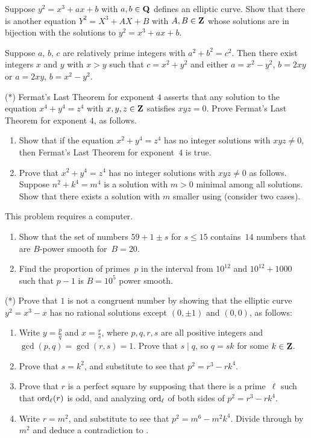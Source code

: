 \begin{exercises}
\item \label{ex:elltrans}
 Suppose $y^2=x^3+ax+b$ with $a,b\in\mathbf{Q}$ defines an elliptic
curve.  Show that there is another equation $Y^2=X^3+AX+B$ with
$A,B\in\mathbf{Z}$ whose solutions are in bijection with the
solutions to $y^2=x^3+ax+b$.


\item\label{ex:pythag} Suppose $a$, $b$, $c$ are relatively prime
  integers with $a^2+b^2=c^2$.  Then there exist integers $x$ and $y$
  with $x>y$ such that $c=x^2+y^2$ and either $a=x^2-y^2$, $b=2xy$ or
  $a=2xy$, $b=x^2-y^2$.


\item\label{ex:flt4}(*) Fermat's Last Theorem for exponent $4$ asserts
  that any solution to the equation $x^4+y^4=z^4$ with $x,y,z\in\mathbf{Z}$
  satisfies $xyz=0$.  Prove Fermat's Last
  Theorem for exponent $4$, as follows.
\begin{enumerate}
\item Show that if the equation $x^2+y^4=z^4$ has no integer solutions
  with $xyz\neq 0$, then Fermat's Last Theorem for exponent~$4$ is
  true.
\item Prove that $x^2+y^4=z^4$ has no integer solutions with $xyz\neq
  0$ as follows.  Suppose $n^2+k^4=m^4$ is a solution with $m>0$
  minimal among all solutions.  Show that there exists a solution with
  $m$ smaller using  (consider two cases).
\end{enumerate}

\item \label{ex:bpowersmooth}
This problem requires a computer.
\begin{enumerate}
\item Show that the set of numbers $59+1\pm
s$ for $s\leq 15$ contains~$14$ numbers that are $B$-power smooth
for~$B=20$.
\item
Find the proportion of primes~$p$ in the interval
from $10^{12}$ and $10^{12}+1000$ such that $p-1$ is
$B=10^5$ power smooth.
\end{enumerate}

\item\label{ex:cong1}(*) Prove that $1$ is not a congruent number by
  showing that the elliptic curve $y^2=x^3-x$ has no rational
  solutions except $(0,\pm 1)$ and $(0,0)$, as follows:
\begin{enumerate}
\item Write $y=\frac{p}{q}$ and $x=\frac{r}{s}$, where $p,q,r,s$ are
all positive integers and $\gcd(p,q)=\gcd(r,s)=1$.  Prove that $s\mid
q$, so $q=sk$ for some $k\in\mathbf{Z}$.
\item Prove that $s=k^2$, and substitute to see that
$p^2=r^3-rk^4$.
\item Prove that $r$ is a perfect square by supposing that there is a
  prime~$\ell$ such that $\operatorname{ord}_{\ell}(r)$ is odd, and analyzing
  $\operatorname{ord}_{\ell}$ of both sides of $p^2=r^3-rk^4$.
\item Write $r=m^2$, and substitute to see that $p^2=m^6-m^2k^4$. Divide through by $m^2$ and deduce a contradiction
to .
\end{enumerate}

\end{exercises}


